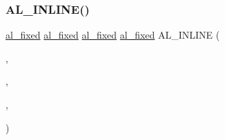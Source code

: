 \mbox{\label{fmaths_8inl_a819c331675fc56dbad3f5c31a52d58fa}} 
\subsubsection{\texorpdfstring{A\+L\+\_\+\+I\+N\+L\+I\+N\+E()}{AL\_INLINE()}\hspace{0.1cm}{\footnotesize\ttfamily [6/7]}}
{\footnotesize\ttfamily \hyperlink{fixed_8h_acaad2e927f969d9882d1e1e80ac1c5e2}{al\+\_\+fixed} \hyperlink{fixed_8h_acaad2e927f969d9882d1e1e80ac1c5e2}{al\+\_\+fixed} \hyperlink{fixed_8h_acaad2e927f969d9882d1e1e80ac1c5e2}{al\+\_\+fixed} \hyperlink{fixed_8h_acaad2e927f969d9882d1e1e80ac1c5e2}{al\+\_\+fixed} A\+L\+\_\+\+I\+N\+L\+I\+NE (\begin{DoxyParamCaption}\item[{\hyperlink{fixed_8h_acaad2e927f969d9882d1e1e80ac1c5e2}{al\+\_\+fixed}}]{,  }\item[{al\+\_\+fixcos}]{,  }\item[{(\hyperlink{fixed_8h_acaad2e927f969d9882d1e1e80ac1c5e2}{al\+\_\+fixed} \hyperlink{fmaths_8inl_a7ba8ab2f1e8f362163e17da3f15a5db9}{x})}]{,  }\item[{\{ return \+\_\+al\+\_\+fix\+\_\+cos\+\_\+tbl\mbox{[}((\hyperlink{fmaths_8inl_a7ba8ab2f1e8f362163e17da3f15a5db9}{x}+0x4000) $>$$>$ 15) \&0x1\+F\+F\mbox{]};\}}]{ }\end{DoxyParamCaption})}

\mbox{\label{fmaths_8inl_a914bc5a5d1a6a2fb2f1da16048169c25}} 
